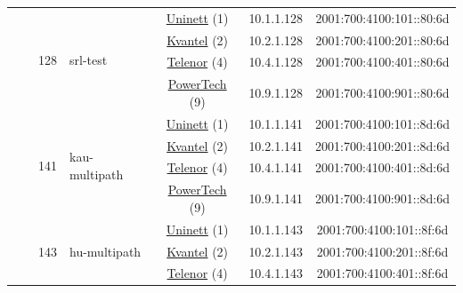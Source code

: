 \begin{small}
\begin{center}
\begin{longtable}{|c|c|c|c|c|c|c|c|}
  &  & \multirow{4}{*}{\tiny{128}} & \multicolumn{1}{|l|}{\multirow{4}{*}{\tiny{srl-test}}} & \multicolumn{2}{|c|}{\tiny{\href{https://www.uninett.no}{Uninett} (1)}} & \tiny{10.1.1.128} & \tiny{2001:700:4100:101::80:6d} \\* \cline{5-5}\cline{6-6}\cline{7-7}\cline{8-8}
  &  &  &  & \multicolumn{2}{|c|}{\tiny{\href{http://kvantel.no}{Kvantel} (2)}} & \tiny{10.2.1.128} & \tiny{2001:700:4100:201::80:6d} \\* \cline{5-5}\cline{6-6}\cline{7-7}\cline{8-8}
  &  &  &  & \multicolumn{2}{|c|}{\tiny{\href{https://www.telenor.no}{Telenor} (4)}} & \tiny{10.4.1.128} & \tiny{2001:700:4100:401::80:6d} \\* \cline{5-5}\cline{6-6}\cline{7-7}\cline{8-8}
  &  &  &  & \multicolumn{2}{|c|}{\tiny{\href{http://www.powertech.no}{PowerTech} (9)}} & \tiny{10.9.1.128} & \tiny{2001:700:4100:901::80:6d} \\* \cline{3-3}\cline{4-4}\cline{5-5}\cline{6-6}\cline{7-7}\cline{8-8}
  &  & \multirow{4}{*}{\tiny{141}} & \multicolumn{1}{|l|}{\multirow{4}{*}{\tiny{kau-multipath}}} & \multicolumn{2}{|c|}{\tiny{\href{https://www.uninett.no}{Uninett} (1)}} & \tiny{10.1.1.141} & \tiny{2001:700:4100:101::8d:6d} \\* \cline{5-5}\cline{6-6}\cline{7-7}\cline{8-8}
  &  &  &  & \multicolumn{2}{|c|}{\tiny{\href{http://kvantel.no}{Kvantel} (2)}} & \tiny{10.2.1.141} & \tiny{2001:700:4100:201::8d:6d} \\* \cline{5-5}\cline{6-6}\cline{7-7}\cline{8-8}
  &  &  &  & \multicolumn{2}{|c|}{\tiny{\href{https://www.telenor.no}{Telenor} (4)}} & \tiny{10.4.1.141} & \tiny{2001:700:4100:401::8d:6d} \\* \cline{5-5}\cline{6-6}\cline{7-7}\cline{8-8}
  &  &  &  & \multicolumn{2}{|c|}{\tiny{\href{http://www.powertech.no}{PowerTech} (9)}} & \tiny{10.9.1.141} & \tiny{2001:700:4100:901::8d:6d} \\* \cline{3-3}\cline{4-4}\cline{5-5}\cline{6-6}\cline{7-7}\cline{8-8}
  &  & \multirow{4}{*}{\tiny{143}} & \multicolumn{1}{|l|}{\multirow{4}{*}{\tiny{hu-multipath}}} & \multicolumn{2}{|c|}{\tiny{\href{https://www.uninett.no}{Uninett} (1)}} & \tiny{10.1.1.143} & \tiny{2001:700:4100:101::8f:6d} \\* \cline{5-5}\cline{6-6}\cline{7-7}\cline{8-8}
  &  &  &  & \multicolumn{2}{|c|}{\tiny{\href{http://kvantel.no}{Kvantel} (2)}} & \tiny{10.2.1.143} & \tiny{2001:700:4100:201::8f:6d} \\* \cline{5-5}\cline{6-6}\cline{7-7}\cline{8-8}
  &  &  &  & \multicolumn{2}{|c|}{\tiny{\href{https://www.telenor.no}{Telenor} (4)}} & \tiny{10.4.1.143} & \tiny{2001:700:4100:401::8f:6d} \\* \cline{5-5}\cline{6-6}\cline{7-7}\cline{8-8}

\end{longtable}
\end{center}
\end{small}
